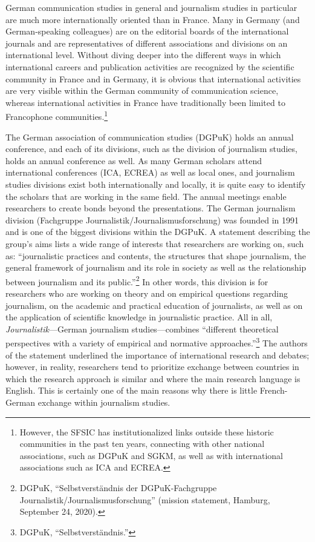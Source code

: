 \documentclass{tufte-handout}
\begin{document}
German communication studies in general and journalism studies in
particular are much more internationally oriented than in France. Many
in Germany (and German-speaking colleagues) are on the editorial boards
of the international journals and are representatives of different
associations and divisions on an international level. Without diving
deeper into the different ways in which international careers and
publication activities are recognized by the scientific community in
France and in Germany, it is obvious that international activities are
very visible within the German community of communication science,
whereas international activities in France have traditionally been
limited to Francophone communities.\footnote{However, the SFSIC has
  institutionalized links outside these historic communities in the past
  ten years, connecting with other national associations, such as DGPuK
  and SGKM, as well as with international associations such as ICA and
  ECREA.}

The German association of communication studies (DGPuK) holds an annual
conference, and each of its divisions, such as the division of
journalism studies, holds an annual conference as well. As many German
scholars attend international conferences (ICA, ECREA) as well as local
ones, and journalism studies divisions exist both internationally and
locally, it is quite easy to identify the scholars that are working in
the same field. The annual meetings enable researchers to create bonds
beyond the presentations. The German journalism division (Fachgruppe
Journalistik/Journalismusforschung) was founded in 1991 and is one of
the biggest divisions within the DGPuK. A statement describing the
group's aims lists a wide range of interests that researchers are
working on, such as: ``journalistic practices and contents, the
structures that shape journalism, the general framework of journalism
and its role in society as well as the relationship between journalism
and its public.''\footnote{DGPuK, ``Selbstverständnis der
  DGPuK-Fachgruppe Journalistik/Journalismusforschung'' (mission
  statement, Hamburg, September 24, 2020).} In other words, this
division is for researchers who are working on theory and on empirical
questions regarding journalism, on the academic and practical education
of journalists, as well as on the application of scientific knowledge in
journalistic practice. All in all, \emph{Journalistik}---German
journalism studies---combines ``different theoretical perspectives with
a variety of empirical and normative approaches.''\footnote{DGPuK,
  ``Selbstverständnis.''} The authors of the statement underlined the
importance of international research and debates; however, in reality,
researchers tend to prioritize exchange between countries in which the
research approach is similar and where the main research language is
English. This is certainly one of the main reasons why there is little
French-German exchange within journalism studies.
\end{document}
